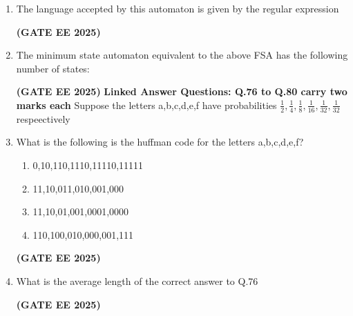 \documentclass[journal,12pt,onecolumn]{IEEEtran}
\theoremstyle{remark}
\begin{document}
\begin {center}
\begin{enumerate}
\item The language accepted by this automaton is given by the regular expression
\begin{enumerate}
\end{enumerate}
\hfill \textbf{(GATE EE 2025)}
\item The minimum state automaton equivalent to the above FSA has the following number of states:
\begin{enumerate}
\end{enumerate}
\hfill \textbf{(GATE EE 2025)}
\newline
\textbf{Linked Answer Questions: Q.76 to Q.80 carry two marks each}
\newline
Suppose the letters a,b,c,d,e,f have probabilities $\frac{1}{2},\frac{1}{4},\frac{1}{8},\frac{1}{16},\frac{1}{32},\frac{1}{32}$ respeectively 


\item What is the following is the huffman code for the letters a,b,c,d,e,f?
\begin{enumerate}
    \item 0,10,110,1110,11110,11111
    \item 11,10,011,010,001,000
    \item 11,10,01,001,0001,0000
    \item 110,100,010,000,001,111
\end{enumerate}
\hfill \textbf{(GATE EE 2025)}
\item What is the average length of the correct answer to Q.76
\begin{enumerate}
\end{enumerate}
 \hfill \textbf{(GATE EE 2025)}


\end{enumerate}
\end{center}
\end{document}
